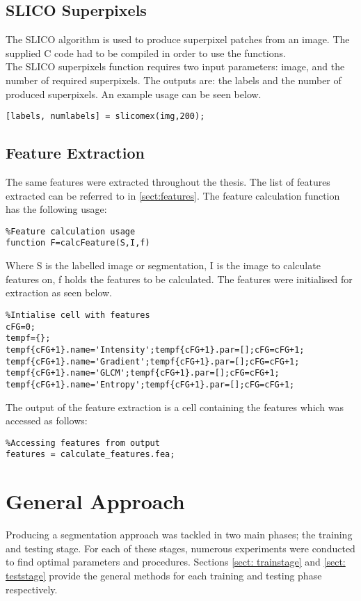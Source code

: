 \subsection{SLICO Superpixels}
\label{sect:slico}
The SLICO algorithm is used to produce superpixel patches from an image. The supplied C code had to be compiled in order to use the functions.
\\[1\baselineskip]
 The SLICO superpixels function requires two input parameters: image, and the number of required superpixels. The outputs are: the labels and the number of produced superpixels. An example usage can be seen below. 
\begin{lstlisting}
[labels, numlabels] = slicomex(img,200);
\end{lstlisting}

\subsection{Feature Extraction}
\label{sect:calcFeature}
The same features were extracted throughout the thesis. The list of features extracted can be referred to in \ref{sect:features}. The feature calculation function has the following usage:
\begin{lstlisting}
%Feature calculation usage
function F=calcFeature(S,I,f)
\end{lstlisting}
\medskip
Where S is the labelled image or segmentation, I is the image to calculate features on, f holds the features to be calculated. The features were initialised for extraction as seen below.
\begin{lstlisting}
%Intialise cell with features
cFG=0;
tempf={};
tempf{cFG+1}.name='Intensity';tempf{cFG+1}.par=[];cFG=cFG+1;
tempf{cFG+1}.name='Gradient';tempf{cFG+1}.par=[];cFG=cFG+1;
tempf{cFG+1}.name='GLCM';tempf{cFG+1}.par=[];cFG=cFG+1;
tempf{cFG+1}.name='Entropy';tempf{cFG+1}.par=[];cFG=cFG+1;
\end{lstlisting}
\medskip
The output of the feature extraction is a cell containing the features which was accessed as follows:
\begin{lstlisting}
%Accessing features from output
features = calculate_features.fea;
\end{lstlisting}

\section{General Approach}
Producing a segmentation approach was tackled in two main phases; the training and testing stage. For each of these stages, numerous experiments were conducted to find optimal parameters and procedures. Sections \ref{sect: trainstage} and \ref{sect: teststage} provide the general methods for each training and testing phase respectively.

